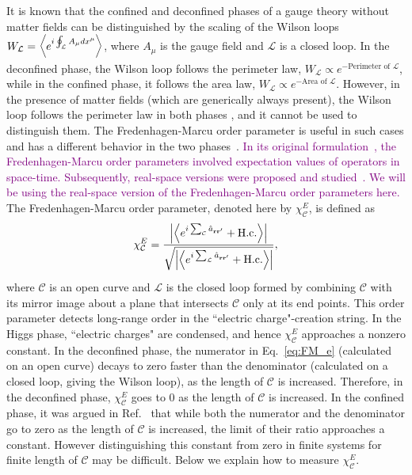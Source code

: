 \documentclass[twocolumn,superscriptaddress,amsmath,amssymb,aps,prx,nofootinbib]{revtex4-2}
\newcommand{\newtext}[1]{\textcolor{purple}{#1}}
\begin{document}
It is known that the confined and deconfined phases of a gauge theory without matter fields can be distinguished by the scaling of the Wilson loops $W_\mathcal{L} = \expval{ e^{i \oint_\mathcal{L} A_\mu dx^\mu} }$, where $A_\mu$ is the gauge field and $\mathcal{L}$ is a closed loop. In the deconfined phase, the Wilson loop follows the perimeter law, $W_{\mathcal{L}} \propto e^{-\text{Perimeter of }\mathcal{L}}$, while in the confined phase, it follows the area law, $W_{\mathcal{L}} \propto e^{-\text{Area of }\mathcal{L}}$. However, in the presence of matter fields (which are generically always present), the Wilson loop follows the perimeter law in both phases \cite{fradkin2013field,shankar2017quantum}, and it cannot be used to distinguish  them. The Fredenhagen-Marcu order parameter is useful in such cases and has  a different behavior in the two phases~\cite{fredenhagen1983charged,fredenhagen1986,fredenhagen1988dual,marcu1986uses,bricmont1983order,gregor2011diagnosing,verresen2021,semeghini2021}. 
\newtext{In its original formulation~\cite{fredenhagen1983charged}, the Fredenhagen-Marcu order parameters involved expectation values of operators in space-time. Subsequently, real-space versions were proposed and studied~\cite{fredenhagen1988dual,gregor2011diagnosing,verresen2021,xu2024critical}. We will be using the real-space version of the Fredenhagen-Marcu order parameters here.}
The Fredenhagen-Marcu order parameter, denoted here by $\chi^E_{\mathcal{C}}$, is defined as
\begin{equation} \label{eq:FM_e}
  \chi_{\mathcal{C}}^E = \frac{\abs{ \expval{ e^{i\sum_\mathcal{C} \hat{a}_{\vb{r}\vb{r}'}  } +\text{H.c.} } } }{\sqrt{ \abs{ \expval{ e^{i \sum_{\mathcal{L}} \hat{a}_{\vb{r} \vb{r}'} } + \text{H.c.} }  }}},
\end{equation}
where $\mathcal{C}$ is an open curve and $\mathcal{L}$ is the closed loop formed by combining $\mathcal{C}$ with its mirror image about a plane that intersects $\mathcal{C}$ only at its end points. This order parameter detects long-range order in the ``electric charge"-creation string. In the Higgs phase, ``electric charges" are condensed, and hence $\chi_{\mathcal{C}}^E$ approaches a nonzero constant. In the deconfined phase, the numerator in Eq.~\eqref{eq:FM_e} (calculated on an open curve) decays to zero faster than the denominator (calculated on a closed loop, giving the Wilson loop), as the length of $\mathcal{C}$ is increased. Therefore, in the deconfined phase, $\chi_{\mathcal{C}}^E$ goes to 0 as the length of $\mathcal{C}$ is increased. In the confined phase, it was argued in Ref.~\cite{fredenhagen1986} that while both the numerator and the denominator go to zero as the length of $\mathcal{C}$ is increased, the limit of their ratio approaches a constant. However distinguishing this constant from zero in finite systems for finite length of $\mathcal{C}$ may be difficult.
Below we explain how to measure $\chi_{\mathcal{C}}^E$. 
\end{document}
